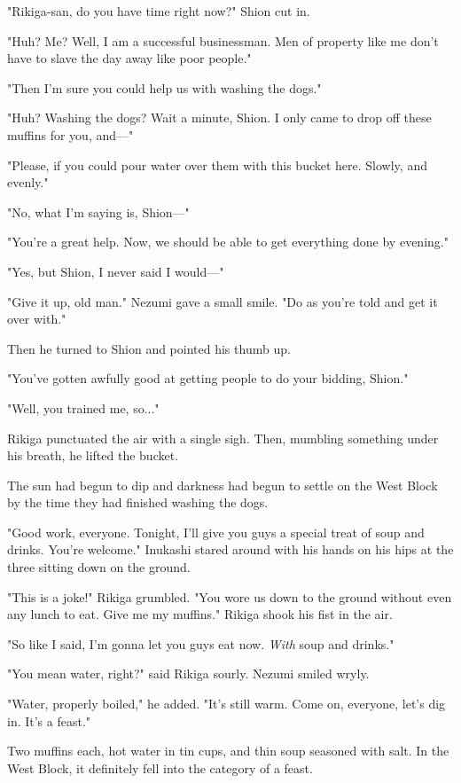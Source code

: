 "Rikiga-san, do you have time right now?" Shion cut in.

"Huh? Me? Well, I am a successful businessman. Men of property like me
don't have to slave the day away like poor people."

"Then I'm sure you could help us with washing the dogs."

"Huh? Washing the dogs? Wait a minute, Shion. I only came to drop off
these muffins for you, and---"

"Please, if you could pour water over them with this bucket here.
Slowly, and evenly."

"No, what I'm saying is, Shion---"

"You're a great help. Now, we should be able to get everything done by
evening."

"Yes, but Shion, I never said I would---"

"Give it up, old man." Nezumi gave a small smile. "Do as you're told and
get it over with."

Then he turned to Shion and pointed his thumb up.

"You've gotten awfully good at getting people to do your bidding,
Shion."

"Well, you trained me, so..."

Rikiga punctuated the air with a single sigh. Then, mumbling something
under his breath, he lifted the bucket.

\myspace

The sun had begun to dip and darkness had begun to settle on the West
Block by the time they had finished washing the dogs.

"Good work, everyone. Tonight, I'll give you guys a special treat of
soup and drinks. You're welcome." Inukashi stared around with his hands
on his hips at the three sitting down on the ground.

"This is a joke!" Rikiga grumbled. "You wore us down to the ground
without even any lunch to eat. Give me my muffins." Rikiga shook his
fist in the air.

"So like I said, I'm gonna let you guys eat now. \emph{With} soup and drinks."

"You mean water, right?" said Rikiga sourly. Nezumi smiled wryly.

"Water, properly boiled," he added. "It's still warm. Come on, everyone,
let's dig in. It's a feast."

Two muffins each, hot water in tin cups, and thin soup seasoned with
salt. In the West Block, it definitely fell into the category of a
feast.


